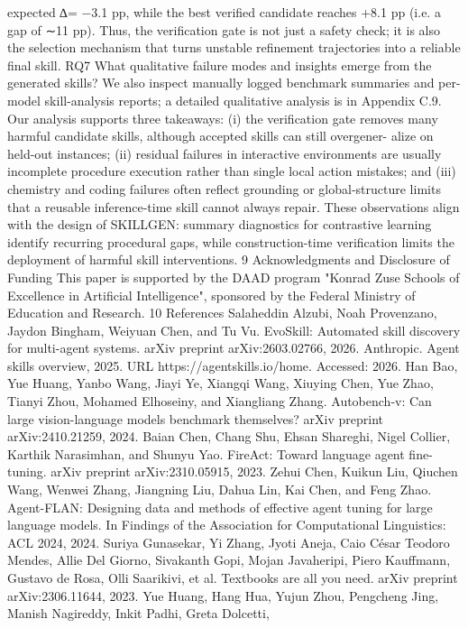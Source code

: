 expected ∆= −3.1 pp, while the best verified candidate reaches +8.1 pp (i.e. a gap of ∼11 pp).
Thus, the verification gate is not just a safety check; it is also the selection mechanism that turns
unstable refinement trajectories into a reliable final skill.
RQ7 What qualitative failure modes and insights emerge from the generated skills?
We also inspect manually logged benchmark summaries and per-model skill-analysis reports; a
detailed qualitative analysis is in Appendix C.9. Our analysis supports three takeaways: (i) the
verification gate removes many harmful candidate skills, although accepted skills can still overgener-
alize on held-out instances; (ii) residual failures in interactive environments are usually incomplete
procedure execution rather than single local action mistakes; and (iii) chemistry and coding failures
often reflect grounding or global-structure limits that a reusable inference-time skill cannot always
repair. These observations align with the design of SKILLGEN: summary diagnostics for contrastive
learning identify recurring procedural gaps, while construction-time verification limits the deployment
of harmful skill interventions.
9
Acknowledgments and Disclosure of Funding
This paper is supported by the DAAD program "Konrad Zuse Schools of Excellence in Artificial
Intelligence", sponsored by the Federal Ministry of Education and Research.
10
References
Salaheddin Alzubi, Noah Provenzano, Jaydon Bingham, Weiyuan Chen, and Tu Vu. EvoSkill:
Automated skill discovery for multi-agent systems. arXiv preprint arXiv:2603.02766, 2026.
Anthropic. Agent skills overview, 2025. URL https://agentskills.io/home. Accessed: 2026.
Han Bao, Yue Huang, Yanbo Wang, Jiayi Ye, Xiangqi Wang, Xiuying Chen, Yue Zhao, Tianyi Zhou,
Mohamed Elhoseiny, and Xiangliang Zhang. Autobench-v: Can large vision-language models
benchmark themselves? arXiv preprint arXiv:2410.21259, 2024.
Baian Chen, Chang Shu, Ehsan Shareghi, Nigel Collier, Karthik Narasimhan, and Shunyu Yao.
FireAct: Toward language agent fine-tuning. arXiv preprint arXiv:2310.05915, 2023.
Zehui Chen, Kuikun Liu, Qiuchen Wang, Wenwei Zhang, Jiangning Liu, Dahua Lin, Kai Chen, and
Feng Zhao. Agent-FLAN: Designing data and methods of effective agent tuning for large language
models. In Findings of the Association for Computational Linguistics: ACL 2024, 2024.
Suriya Gunasekar, Yi Zhang, Jyoti Aneja, Caio César Teodoro Mendes, Allie Del Giorno, Sivakanth
Gopi, Mojan Javaheripi, Piero Kauffmann, Gustavo de Rosa, Olli Saarikivi, et al. Textbooks are all
you need. arXiv preprint arXiv:2306.11644, 2023.
Yue Huang, Hang Hua, Yujun Zhou, Pengcheng Jing, Manish Nagireddy, Inkit Padhi, Greta Dolcetti,
